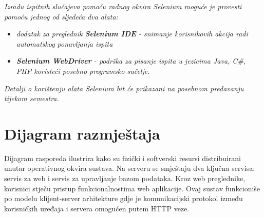 			 \textit{Izradu ispitnih slučajeva pomoću radnog okvira Selenium moguće je provesti pomoću jednog od sljedeća dva alata:}
			 \begin{itemize}
			 	\item \textit{dodatak za preglednik \textbf{Selenium IDE} - snimanje korisnikovih akcija radi automatskog ponavljanja ispita	}
			 	\item \textit{\textbf{Selenium WebDriver} - podrška za pisanje ispita u jezicima Java, C\#, PHP koristeći posebno programsko sučelje.}
			 \end{itemize}
		 	\textit{Detalji o korištenju alata Selenium bit će prikazani na posebnom predavanju tijekom semestra.}
			
			\eject 
		
		
		\section{Dijagram razmještaja}
			
			Dijagram rasporeda ilustrira kako su fizički i softverski resursi distribuirani unutar operativnog okvira sustava. Na serveru se smještaju dva ključna servisa: servis za web i servis za upravljanje bazom podataka. Kroz web preglednike, korisnici stječu pristup funkcionalnostima web aplikacije. Ovaj sustav funkcioniše po modelu klijent-server arhitekture gdje je komunikacijski protokol između korisničkih uređaja i servera omogućen putem HTTP veze.

